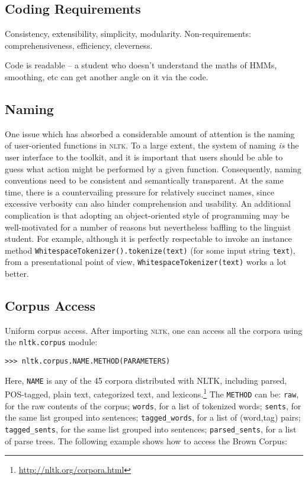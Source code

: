 \documentclass[11pt]{article}
\newcommand{\NLTK}{\textsc{nltk}}
\newcommand{\code}[1]{\texttt{\small #1}}
\begin{document}
\subsection{Coding Requirements}

Consistency, extensibility, simplicity, modularity.
Non-requirements: comprehensiveness, efficiency, cleverness.
\cite{LoperBird02}

Code is readable -- a student who doesn't understand the maths of HMMs,
smoothing, etc can get another angle on it via the code.

\subsection{Naming}

One issue which has absorbed a considerable amount of attention is the
naming of user-oriented functions in \NLTK. To a large extent, the
system of naming \emph{is} the user interface to the toolkit, and it is
important that users should be able to guess what action might be
performed by a given function. Consequently, naming conventions need
to be consistent and semantically transparent. At the same time, there is a
countervailing pressure for relatively succinct names, since excessive verbosity
can also hinder comprehension and usability. An additional
complication is that adopting an object-oriented style of programming
may be well-motivated for a number of reasons but nevertheless
baffling to the linguist student. For example, although it is
perfectly respectable to invoke an instance method
\code{WhitespaceTokenizer().tokenize(text)} (for some input
string \code{text}), from a presentational point of view, 
\code{WhitespaceTokenizer(text)} works a lot better.

\subsection{Corpus Access}

Uniform corpus access.  After importing \NLTK, one can access all the corpora
using the \code{nltk.corpus} module:

{\small\begin{verbatim}
>>> nltk.corpus.NAME.METHOD(PARAMETERS)
\end{verbatim}}

Here, \code{NAME} is any of the 45 corpora distributed with NLTK, including
parsed, POS-tagged, plain text, categorized text, and lexicons.\footnote{\url{http://nltk.org/corpora.html}}
The \code{METHOD} can be:
\code{raw}, for the raw contents of the corpus;
\code{words}, for a list of tokenized words;
\code{sents}, for the same list grouped into sentences;
\code{tagged\_words}, for a list of (word,tag) pairs;
\code{tagged\_sents}, for the same list grouped into sentences;
\code{parsed\_sents}, for a list of parse trees.
The following example shows how to access the Brown Corpus:
\end{document}
